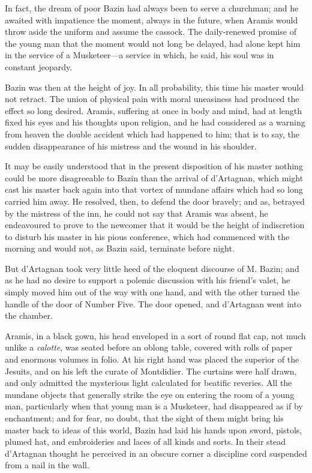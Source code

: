 In fact, the dream of poor Bazin had always been to serve a churchman; and he awaited with impatience the moment, always in the future, when Aramis would throw aside the uniform and assume the cassock. The daily-renewed promise of the young man that the moment would not long be delayed, had alone kept him in the service of a Musketeer---a service in which, he said, his soul was in constant jeopardy. 

Bazin was then at the height of joy. In all probability, this time his master would not retract. The union of physical pain with moral uneasiness had produced the effect so long desired. Aramis, suffering at once in body and mind, had at length fixed his eyes and his thoughts upon religion, and he had considered as a warning from heaven the double accident which had happened to him; that is to say, the sudden disappearance of his mistress and the wound in his shoulder. 

It may be easily understood that in the present disposition of his master nothing could be more disagreeable to Bazin than the arrival of d'Artagnan, which might cast his master back again into that vortex of mundane affairs which had so long carried him away. He resolved, then, to defend the door bravely; and as, betrayed by the mistress of the inn, he could not say that Aramis was absent, he endeavoured to prove to the newcomer that it would be the height of indiscretion to disturb his master in his pious conference, which had commenced with the morning and would not, as Bazin said, terminate before night. 

But d'Artagnan took very little heed of the eloquent discourse of M. Bazin; and as he had no desire to support a polemic discussion with his friend's valet, he simply moved him out of the way with one hand, and with the other turned the handle of the door of Number Five. The door opened, and d'Artagnan went into the chamber. 

Aramis, in a black gown, his head enveloped in a sort of round flat cap, not much unlike a \textit{calotte}, was seated before an oblong table, covered with rolls of paper and enormous volumes in folio. At his right hand was placed the superior of the Jesuits, and on his left the curate of Montdidier. The curtains were half drawn, and only admitted the mysterious light calculated for beatific reveries. All the mundane objects that generally strike the eye on entering the room of a young man, particularly when that young man is a Musketeer, had disappeared as if by enchantment; and for fear, no doubt, that the sight of them might bring his master back to ideas of this world, Bazin had laid his hands upon sword, pistols, plumed hat, and embroideries and laces of all kinds and sorts. In their stead d'Artagnan thought he perceived in an obscure corner a discipline cord suspended from a nail in the wall. 

